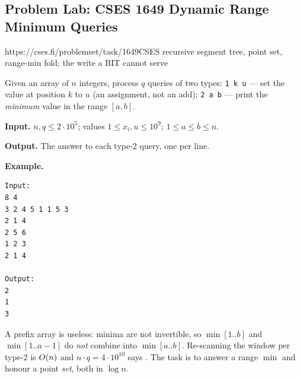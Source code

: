 \subsection{Problem Lab: CSES 1649 Dynamic Range Minimum Queries}

  {https://cses.fi/problemset/task/1649}{CSES}
  {recursive segment tree, point set, range-min fold; the write a BIT cannot serve}

\begin{problemstatement}
Given an array of \(n\) integers, process \(q\) queries of two types:
\texttt{1 k u} --- set the value at position \(k\) to \(u\) (an assignment,
not an add); \texttt{2 a b} --- print the \emph{minimum} value in the range
\([a,b]\).

\textbf{Input.} \(n,q\le 2\cdot10^5\); values \(1\le x_i,u\le10^9\);
\(1\le a\le b\le n\).

\textbf{Output.} The answer to each type-2 query, one per line.

\textbf{Example.}
\begin{verbatim}
Input:
8 4
3 2 4 5 1 1 5 3
2 1 4
2 5 6
1 2 3
2 1 4

Output:
2
1
3
\end{verbatim}
\end{problemstatement}

\begin{attemptgate}
A prefix array is useless: minima are not invertible, so \(\min[1..b]\) and
\(\min[1..a{-}1]\) do \emph{not} combine into \(\min[a..b]\).  Re-scanning the
window per type-2 is \(O(n)\) and \(n\cdot q=4\cdot10^{10}\) says \tle.
The task is to answer a range \(\min\) and honour a point \emph{set}, both in
\(\log n\).
\end{attemptgate}

